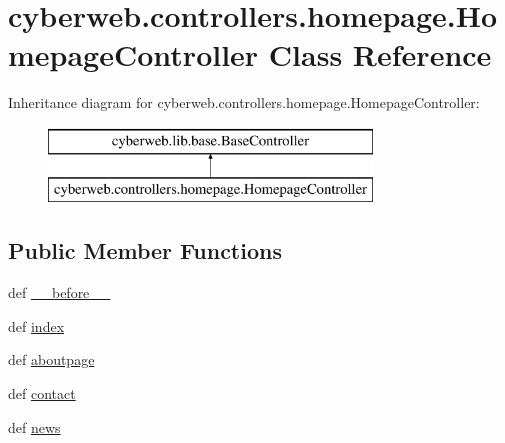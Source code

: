 \hypertarget{classcyberweb_1_1controllers_1_1homepage_1_1_homepage_controller}{\section{cyberweb.\-controllers.\-homepage.\-Homepage\-Controller \-Class \-Reference}
\label{classcyberweb_1_1controllers_1_1homepage_1_1_homepage_controller}
}
\-Inheritance diagram for cyberweb.\-controllers.\-homepage.\-Homepage\-Controller\-:\begin{figure}[H]
\begin{center}
\leavevmode
\includegraphics[height=2.000000cm]{classcyberweb_1_1controllers_1_1homepage_1_1_homepage_controller}
\end{center}
\end{figure}
\subsection*{\-Public \-Member \-Functions}
\begin{DoxyCompactItemize}
\item 
def \hyperlink{classcyberweb_1_1controllers_1_1homepage_1_1_homepage_controller_a168d6fd53f231af1a24525fc3f310c20}{\-\_\-\-\_\-before\-\_\-\-\_\-}
\item 
def \hyperlink{classcyberweb_1_1controllers_1_1homepage_1_1_homepage_controller_a5db7a71973401d4305c829f9cb49c78f}{index}
\item 
def \hyperlink{classcyberweb_1_1controllers_1_1homepage_1_1_homepage_controller_a301dd4dac65b95ea6382d5e1de1d802f}{aboutpage}
\item 
def \hyperlink{classcyberweb_1_1controllers_1_1homepage_1_1_homepage_controller_acc4fa33c2a458db9916dc2af0c92b805}{contact}
\item 
def \hyperlink{classcyberweb_1_1controllers_1_1homepage_1_1_homepage_controller_a40baa1cf25ae848b2f035aa8a9c64d37}{news}
\end{DoxyCompactItemize}


